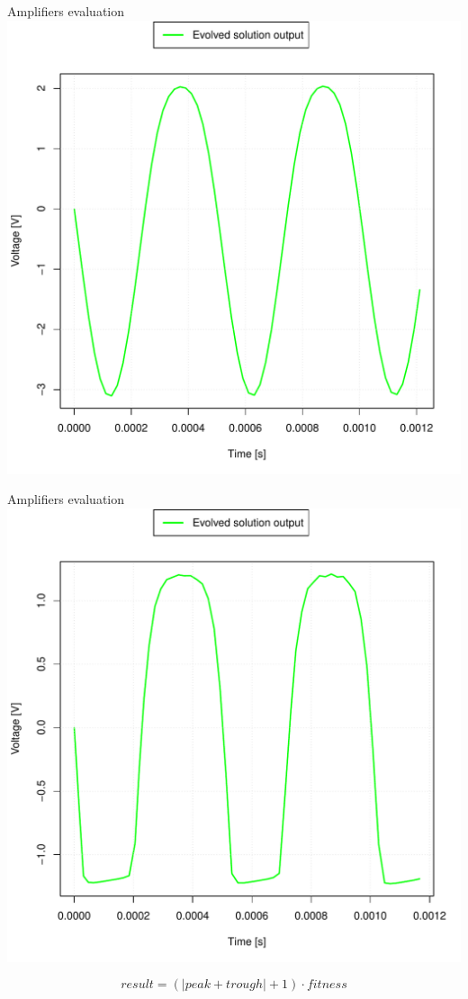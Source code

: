 \documentclass[10pt,xcolor=pdflatex]{beamer}
\begin{document}
\begin{frame}{Amplifiers evaluation}
    \centering
    \includegraphics[scale=.45]{asymmetrical-ideal-sine}
\end{frame}

\begin{frame}{Amplifiers evaluation}
    \centering
    \includegraphics[scale=.4]{symmetrical-ideal-sine}

    \[
        result = (|peak + trough| + 1) \cdot fitness
    \]
\end{frame}
\end{document}
